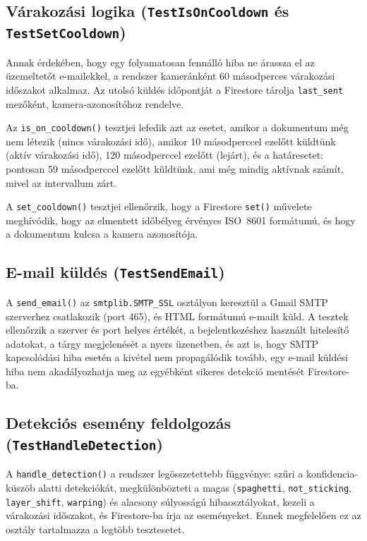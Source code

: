 \documentclass[12pt,a4paper]{article}
\begin{document}
\subsection{Várakozási logika (\texttt{TestIsOnCooldown} és \texttt{TestSetCooldown})}

Annak érdekében, hogy egy folyamatosan fennálló hiba ne árassza el az üzemeltetőt
e-mailekkel, a rendszer kameránként 60 másodperces várakozási időszakot alkalmaz.
Az utolsó küldés időpontját a Firestore tárolja \texttt{last\_sent} mezőként,
kamera-azonosítóhoz rendelve.

Az \texttt{is\_on\_cooldown()} tesztjei lefedik azt az esetet, amikor a dokumentum
még nem létezik (nincs várakozási idő), amikor 10 másodperccel ezelőtt küldtünk
(aktív várakozási idő), 120 másodperccel ezelőtt (lejárt), és a határesetet: pontosan
59 másodperccel ezelőtt küldtünk, ami még mindig aktívnak számít, mivel az
intervallum zárt.

A \texttt{set\_cooldown()} tesztjei ellenőrzik, hogy a Firestore \texttt{set()}
művelete meghívódik, hogy az elmentett időbélyeg érvényes ISO~8601 formátumú,
és hogy a dokumentum kulcsa a kamera azonosítója.

\subsection{E-mail küldés (\texttt{TestSendEmail})}

A \texttt{send\_email()} az \texttt{smtplib.SMTP\_SSL} osztályon keresztül a
Gmail SMTP szerverhez csatlakozik (port 465), és HTML formátumú e-mailt küld.
A tesztek ellenőrzik a szerver és port helyes értékét, a bejelentkezéshez
használt hitelesítő adatokat, a tárgy megjelenését a nyers üzenetben, és azt
is, hogy SMTP kapcsolódási hiba esetén a kivétel nem propagálódik tovább,
egy e-mail küldési hiba nem akadályozhatja meg az egyébként sikeres detekció
mentését Firestore-ba.

\subsection{Detekciós esemény feldolgozás (\texttt{TestHandleDetection})}

A \texttt{handle\_detection()} a rendszer legösszetettebb függvénye: szűri a
konfidencia-küszöb alatti detekciókát, megkülönbözteti a magas
(\texttt{spaghetti}, \texttt{not\_sticking}, \texttt{layer\_shift}, \texttt{warping})
és alacsony súlyosságú hibaosztályokat, kezeli a várakozási időszakot, és Firestore-ba
írja az eseményeket. Ennek megfelelően ez az osztály tartalmazza a legtöbb
tesztesetet.
\end{document}
